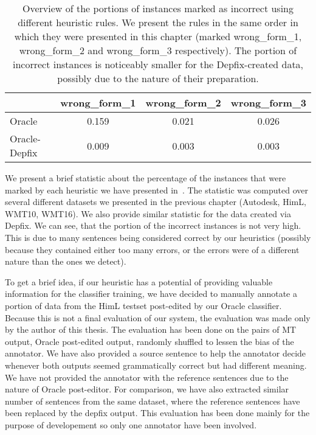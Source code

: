 \begin{table*}[t]
\centering
\small

\begin{tabular}{lccc}
  &  wrong\_form\_1  &  wrong\_form\_2  &  wrong\_form\_3  \\
\hline
Oracle  &  0.159  &  0.021  &  0.026  \\
Oracle-Depfix  & 0.009  &  0.003  &  0.003  \\
\end{tabular}
\caption{
Overview of the portions of instances marked as incorrect using different heuristic rules. We present
the rules in the same order in which they were presented in this chapter (marked wrong\_form\_1, wrong\_form\_2
and wrong\_form\_3 respectively). The portion of incorrect instances is noticeably smaller for the Depfix-created
data, possibly due to the nature of their preparation.
}
\label{marked-stats}
\end{table*}


We present a brief statistic about the percentage of the instances that were marked by each
heuristic we have presented in~. The statistic was computed over several different
datasets we presented in the previous chapter (Autodesk, HimL, WMT10, WMT16). We also provide
similar statistic for the data created via Depfix. We can see, that the portion of the incorrect instances
is not very high. This is due to many sentences being considered correct by our heuristics (possibly because
they contained either too many errors, or the errors were of a different nature than the ones we detect).

To get a brief idea, if our heuristic has a potential of providing valuable information for the classifier
training, we have decided to manually annotate a portion of data from the HimL testset post-edited by our
Oracle classifier. Because this is not a final evaluation of our system, the evaluation was made only
by the author of this thesis. The evaluation has been done on the pairs of MT output, Oracle post-edited
output, randomly shuffled to lessen the bias of the annotator. We have also provided a source sentence
to help the annotator decide whenever both outputs seemed grammatically correct but had different meaning.
We have not provided the annotator with the reference sentences due to the nature of Oracle post-editor. For comparison, we have also extracted
similar number of sentences from the same dataset, where the reference sentences have been replaced
by the depfix output. This evaluation has been done mainly for the purpose
of developement so only one annotator have been involved.

